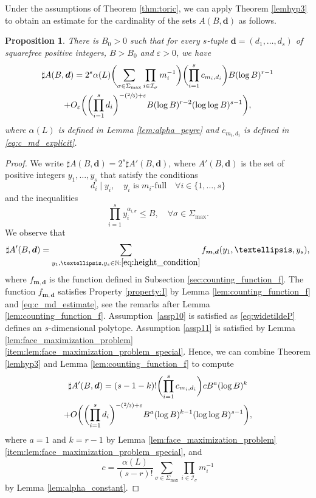 \documentclass[11pt]{article}
\numberwithin{equation}{section}
\let\epsilon\varepsilon
\newcommand{\Psfrac}[2]{(\sfrac{#1}{#2})}
\newcommand{\bfm}{{\boldsymbol{m}}}
\newcommand{\bfd}{\boldsymbol{d}}
\newcommand\NN{\mathbb{N}}
\newcommand{\ic}[1]{\mathcal{I}_{#1}}
\newtheorem{prop}[theorem]{Proposition}
\theoremstyle{definition}
\numberwithin{theorem}{section}
\begin{document}
Under the assumptions of Theorem \ref{thm:toric}, we can apply Theorem \ref{lemhyp3}
to obtain an estimate for the cardinality of the sets $A(B,\bfd)$ as follows.
\begin{prop}
\label{prop:A(B,d)}
There is $B_0>0$ such that for every $s$-tuple $\bfd=(d_1,\dots, d_s)$
of squarefree positive integers, $B>B_0$ and $\epsilon>0$, we have
\begin{multline*}
\sharp A(B,\bfd)= 2^s
\alpha(L)
\biggl(\sum_{\sigma\in\Sigma_{\max}}\prod_{i\in\ic{\sigma}}m_i^{-1}\biggr)
\biggl(\prod_{i=1}^sc_{m_i,d_i}\biggr) B (\log B)^{r-1}
\\+O_{\varepsilon}\biggl(
\biggl(\prod_{i=1}^s d_i\biggr)^{-\Psfrac23+\varepsilon} B (\log B)^{r-2}(\log\log B)^{s-1}
\biggr),
\end{multline*}
where $\alpha(L)$ is defined in Lemma \ref{lem:alpha_peyre} and $c_{m_i,d_i}$
is defined in \eqref{eq:c_md_explicit}.
\end{prop}
\begin{proof}
We write $\sharp A(B,\bfd) = 2^{s}\sharp A'(B,\bfd)$, where
$A'(B,\bfd)$ is the set of positive integers $y_1,\dots,y_s$ that satisfy the conditions
\[
d_i \mid y_i, \quad y_i \text{ is $m_i$-full} \quad\forall i \in\{1,\dots,s\}
\]
and the inequalities
\begin{equation}
\label{eq:height_condition}
\prod_{i=1}^s y_i^{\alpha_{i,\sigma}} \leq B, \quad \forall \sigma\in\Sigma_{\max}.
\end{equation}
We observe that
\[
\sharp A'(B,\bfd)=
\sum_{ y_1,\dots, y_s\in\NN : \eqref{eq:height_condition} }
f_{\bfm, \bfd}(y_1,\dots,y_s),
\]
where $f_{\bfm, \bfd}$ is the function defined in Subsection \ref{sec:counting_function_f}.
The function $f_{\bfm, \bfd}$ satisfies Property \ref{property:I} by Lemma \ref{lem:counting_function_f} and \eqref{eq:c_md_estimate},
see the remarks after Lemma \ref{lem:counting_function_f}.
Assumption~\ref{assp10} is satisfied as \eqref{eq:widetildeP} defines an $s$-dimensional polytope.
Assumption \ref{assp11} is satisfied
by Lemma \ref{lem:face_maximization_problem}\eqref{item:lem:face_maximization_problem_special}.
Hence, we can combine Theorem \ref{lemhyp3} and Lemma \ref{lem:counting_function_f} to compute
\begin{multline}
\sharp A'(B,\bfd)= (s-1-k)! \biggl(\prod_{i=1}^sc_{m_i,d_i}\biggr) c B^{a}(\log B)^k
\\+O\biggl(
\biggl(\prod_{i=1}^s d_i\biggr)^{-\Psfrac23+\varepsilon} B^{a}(\log B)^{k-1}(\log\log B)^{s-1}
\biggr),
\end{multline}
where $a=1$ and $k=r-1$ by
Lemma \ref{lem:face_maximization_problem}\eqref{item:lem:face_maximization_problem_special}, and
\[
c=\frac{\alpha(L)}{(s-r)!}\sum_{\sigma\in\Sigma_{\max}}\prod_{i\in\ic{\sigma}}m_i^{-1}
\]
by Lemma \ref{lem:alpha_constant}.
\end{proof}
\end{document}

